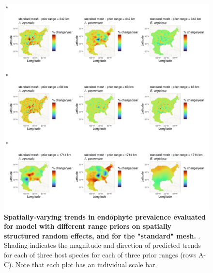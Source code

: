 \documentclass[11pt]{article}
\newcommand{\revise}[1]{{\color{black}{#1}}}
\begin{document}
\begin{figure}[H]
	\centering
	\includegraphics[width = .8\linewidth]{../Plots/standard_mesh_comparison_svc_plot.png}
	\caption[Spatially-varying trends in endophyte prevalence evaluated for models with different range priors on spatially structured random effects, and for the "standard" mesh]{\textbf{Spatially-varying trends in endophyte prevalence evaluated for \revise{the endophyte prevalence} model with different range priors on spatially structured random effects, and for the "standard" mesh.} \revise{Data used in model fitting is the same across all panels and as in the main text}. Shading indicates the magnitude and direction of predicted trends for each of three host species for each of three prior ranges (rows A-C). Note that each plot has an individual scale bar.}
	\label{fig:standard_comparison_svc_plot}
\end{figure}
\end{document}
